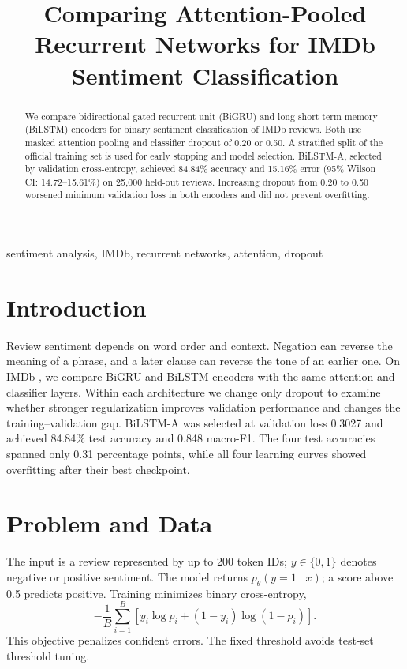 \documentclass[conference]{IEEEtran}
\title{Comparing Attention-Pooled Recurrent Networks for IMDb Sentiment Classification}
\author{\IEEEauthorblockN{Nicholas Ampimah}
\IEEEauthorblockA{University of Nebraska--Lincoln}}
\begin{document}
\maketitle
\begin{abstract}
We compare bidirectional gated recurrent unit (BiGRU) and long short-term memory (BiLSTM) encoders for binary sentiment classification of IMDb reviews. Both use masked attention pooling and classifier dropout of 0.20 or 0.50. A stratified split of the official training set is used for early stopping and model selection. BiLSTM-A, selected by validation cross-entropy, achieved 84.84\% accuracy and 15.16\% error (95\% Wilson CI: 14.72--15.61\%) on 25,000 held-out reviews. Increasing dropout from 0.20 to 0.50 worsened minimum validation loss in both encoders and did not prevent overfitting.
\end{abstract}
\begin{IEEEkeywords}
sentiment analysis, IMDb, recurrent networks, attention, dropout
\end{IEEEkeywords}
\section{Introduction}
Review sentiment depends on word order and context. Negation can reverse the meaning of a phrase, and a later clause can reverse the tone of an earlier one. On IMDb \cite{maas}, we compare BiGRU and BiLSTM encoders with the same attention and classifier layers. Within each architecture we change only dropout to examine whether stronger regularization improves validation performance and changes the training--validation gap. BiLSTM-A was selected at validation loss 0.3027 and achieved 84.84\% test accuracy and 0.848 macro-F1. The four test accuracies spanned only 0.31 percentage points, while all four learning curves showed overfitting after their best checkpoint.

\section{Problem and Data}
The input is a review represented by up to 200 token IDs; $y\in\{0,1\}$ denotes negative or positive sentiment. The model returns $p_\theta(y=1\mid x)$; a score above 0.5 predicts positive. Training minimizes binary cross-entropy,
\begin{equation}
-\frac{1}{B}\sum_{i=1}^{B}[y_i\log p_i+(1-y_i)\log(1-p_i)].
\end{equation}
This objective penalizes confident errors. The fixed threshold avoids test-set threshold tuning.
\end{document}
